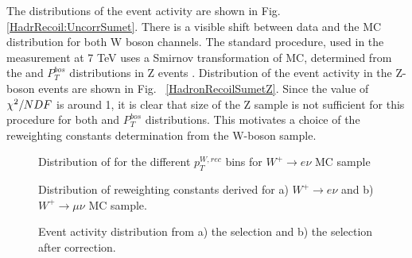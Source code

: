 The distributions of the event activity \sumet  are shown in Fig. \ref{HadrRecoil:UncorrSumet}. There is a visible shift between data and the MC distribution for both W boson channels. The standard procedure, used in the \mtw measurement at 7 TeV uses a Smirnov transformation of MC, determined from the \sumet and $P_{T}^{bos}$ distributions in Z events \cite{HRCorrections}. Distribution of the event activity in the Z-boson events are shown in Fig. ~\ref{HadronRecoilSumetZ}. Since the value of $\chi^2/NDF$ is around 1, it is clear that size of the Z sample is not sufficient for this procedure for both  \sumet and $P_{T}^{bos}$ distributions. This motivates a choice of the \sumet reweighting constants determination from the W-boson sample. 

\begin{figure}[!p]
\begin{minipage}[h]{0.49\linewidth}
\end{minipage}
\hfill
\begin{minipage}[h]{0.49\linewidth}
\end{minipage}
\caption{Distribution of \sumet for the different $p_T^{W, rec}$ bins for $W^{+} \to e \nu$ MC sample}
\label{ris:SumEtCorPtW}
\end{figure}

\begin{figure}[!p]
\begin{minipage}[h]{0.49\linewidth}
\end{minipage}
\hfill
\begin{minipage}[h]{0.49\linewidth}
\end{minipage}
\caption{Distribution of \sumet reweighting constants derived for a) $W^{+} \to e \nu$ and b) $W^{+} \to \mu \nu$ MC sample.}
\label{ris:SumEtCorNoPol}
\end{figure}

\begin{figure}[!p]
\begin{minipage}[h]{0.5\linewidth}
\end{minipage}
\hfill
\begin{minipage}[h]{0.5\linewidth}
\end{minipage}
\caption{Event activity \sumet distribution from a) the \wenu selection and b) the \wmunu selection after \sumet correction. }
\label{HadrRecoil:CorrSumet}
\end{figure}


